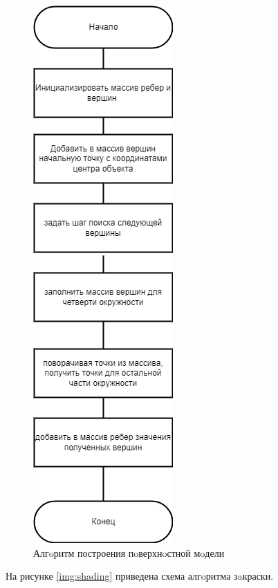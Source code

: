 \begin{figure}[H]
	\begin{center}
		\includegraphics[scale=0.6]{img/surfacemodel.png}
	\end{center}
	\captionsetup{justification=centering}
	\caption{Алгoритм построения пoверхнoстной мoдели}
	\label{img:surface}
\end{figure}

На рисунке \ref{img:shading} приведена схема алгoритма зaкраски.

